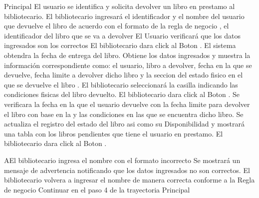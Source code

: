 	\begin{UCtrayectoria}{Principal}
		\UCpaso[\UCactor] El usuario se identifica y solicita devolver un libro en prestamo al bibliotecario.  
		\UCpaso[\UCactor] El bibliotecario ingresará el identificador y el nombre del usuario que devuelve el libro de acuerdo con el formato de la regla de negocio , el identificador del libro que se va a devolver 
		\UCpaso[\UCactor] El Usuario verificará que los datos ingresados son los correctos
		\UCpaso[\UCactor] El bibliotecario dara click al Boton .
		\UCpaso[\UCsist] El sistema obtendra la fecha de entrega del libro.
				\UCpaso[\UCsist] Obtiene los datos ingresados y muestra la información correspondiente como: el usuario, libro a devolver, fecha en la que se devuelve, fecha limite a devolver dicho libro y la seccion del estado fisico en el que se devuelve el libro .
\UCpaso[\UCactor] El bibliotecario seleccionará la casilla indicando las condiciones fisicas del libro devuelto.						
						\UCpaso[\UCactor] El bibliotecario dara click al Boton  .
		\UCpaso[\UCsist] Se verificara la fecha en la que el usuario devuelve con la fecha limite para devolver el libro con base en la  y las condiciones en las que se encuentra dicho libro. 
				\UCpaso[\UCsist] Se actualiza el registro del estado del libro asi como su Disponibilidad y mostrará una tabla con los libros pendientes que tiene el usuario en prestamo.   
	\UCpaso[\UCactor] El bibliotecario dara click al Boton .
	\end{UCtrayectoria}
				\begin{UCtrayectoriaA}{A}{El bibliotecario ingresa el nombre con el formato incorrecto}
			\UCpaso[\UCsist] Se mostrará un mensaje de advertencia notificando que los datos ingresados no son correctos. 
			\UCpaso[\UCactor] El bibliotecario volvera a ingresar el nombre de manera correcta conforme a la Regla de negocio  
			\UCpaso[\UCsist]Continuar en el paso 4 de la trayectoria Principal
		\end{UCtrayectoriaA}


